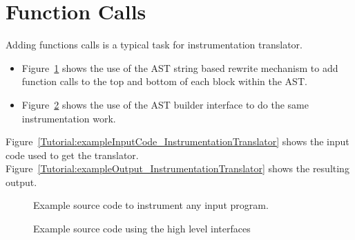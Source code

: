 \clearpage
\section{Function Calls}
Adding functions calls is a typical task for instrumentation translator. 
\begin{itemize}
\item Figure~\ref{Tutorial:exampleInstrumentationTranslator} shows the use of
the AST string based rewrite mechanism to add function calls to the top and bottom of 
each block within the AST.

\item Figure~\ref{Tutorial:exampleAddFunctionCalls} shows the use of
the AST builder interface to do the same instrumentation work.
\end{itemize}
   Figure~\ref{Tutorial:exampleInputCode_InstrumentationTranslator} shows the
input code used to get the translator.
Figure~\ref{Tutorial:exampleOutput_InstrumentationTranslator} shows the resulting output.

\begin{figure}[!ht]
{\indent
{\mySmallFontSize


\begin{latexonly}
   
\end{latexonly}

\begin{htmlonly}
   
\end{htmlonly}

}
}
\caption{Example source code to instrument any input program.}
\label{Tutorial:exampleInstrumentationTranslator}
\end{figure}
\begin{figure}[!ht]
{\indent
{\mySmallFontSize


\begin{latexonly}
   
\end{latexonly}

\begin{htmlonly}
   
\end{htmlonly}

}
}
\caption{Example source code using the high level interfaces}
\label{Tutorial:exampleAddFunctionCalls}
\end{figure}


